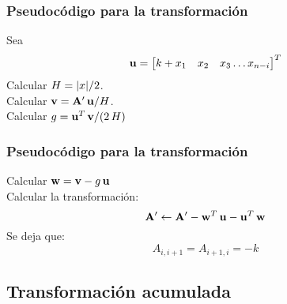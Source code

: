 \documentclass[12pt]{beamer}
\begin{document}
\begin{frame}
\frametitle{Pseudocódigo para la transformación}
\begin{tcolorbox}[colback=melon]
\hspace{1cm} Sea 
\[ \vb{u} = \big[ k + x_{1} \quad x_{2} \quad x_{3} \ldots x_{n-i} \big]^{T} \] \pause
\hspace{1cm} Calcular $H = \abs{x}/2$. \\ \pause
\hspace{1cm} Calcular $\vb{v} = {\vb{A}}^{\prime} \, \vb{u} / H$. \\ \pause
\hspace{1cm} Calcular $g = \vb{u}^{T} \, \vb{v} / (2 \, H)$ 
\end{tcolorbox}
\end{frame}
\begin{frame}
\frametitle{Pseudocódigo para la transformación}
\begin{tcolorbox}[colback=melon]
\hspace{1cm} Calcular $\vb{w} = \vb{v} - g \, \vb{u}$ \\ \pause
\hspace{1cm} Calcular la transformación:
\[ {\vb{A}}^{\prime} \leftarrow {\vb{A}}^{\prime} - \vb{w}^{T} \, \vb{u} - \vb{u}^{T} \, \vb{w} \] \pause
\hspace{1cm} Se deja que:
\[ A_{i, i+1} = A_{i+1, i} = - k \]
\end{tcolorbox}
\end{frame}

\subsection{Transformación acumulada}
\end{document}
